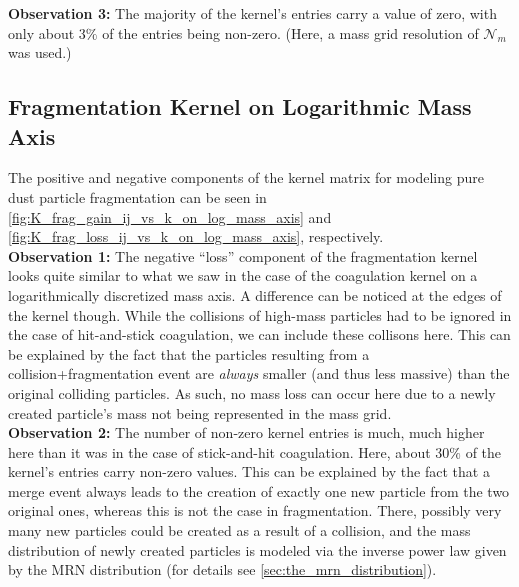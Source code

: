         \textbf{Observation 3:} The majority of the kernel's entries carry a value of zero,
        with only about $3 \%$ of the entries being non-zero. 
        (Here, a mass grid resolution of $\mathcal N_m$ was used.)
       
    \subsection{Fragmentation Kernel on Logarithmic Mass Axis}

        The positive and negative components of the kernel matrix for modeling pure 
        dust particle fragmentation can be seen in 
        \cref{fig:K_frag_gain_ij_vs_k_on_log_mass_axis} and 
        \cref{fig:K_frag_loss_ij_vs_k_on_log_mass_axis}, respectively. \\


        \textbf{Observation 1:} The negative ``loss'' component of the fragmentation kernel 
        looks quite similar to what we saw in the case of the coagulation kernel on a 
        logarithmically discretized mass axis. A difference can be noticed at the edges 
        of the kernel though. While the collisions of high-mass particles had to be 
        ignored in the case of hit-and-stick coagulation, we can include these collisons
        here. This can be explained by the fact that the particles resulting from a 
        collision+fragmentation event are \textit{always} smaller (and thus less massive) than 
        the original colliding particles. As such, no mass loss can occur here due to a 
        newly created particle's mass not being represented in the mass grid. \\

        \textbf{Observation 2:} The number of non-zero kernel entries is much, much higher 
        here than it was in the case of stick-and-hit coagulation. Here, about $30 \%$ of the 
        kernel's entries carry non-zero values. This can be explained by 
        the fact that a merge event always leads to the creation of exactly one new particle 
        from the two original ones, whereas this is not the case in fragmentation. 
        There, possibly very many new particles could be created as a result of a collision,
        and the mass distribution of newly created particles is modeled via the inverse power 
        law given by the MRN distribution (for details see \cref{sec:the_mrn_distribution}). \\

